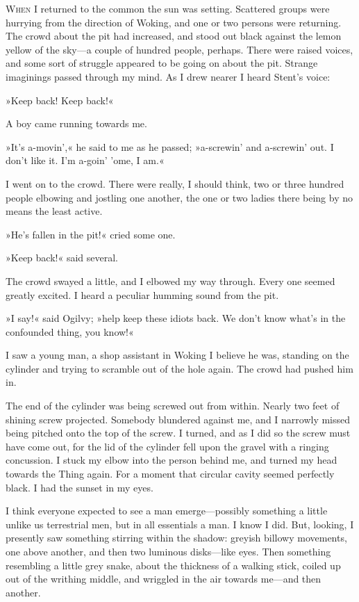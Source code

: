 


\lettrine[lines=4,findent=2pt]{W}{hen} I returned to the common the sun was setting. Scattered groups were hurrying from the direction of Woking, and one or two persons were returning. The crowd about the pit had increased, and stood out black against the lemon yellow of the sky—a couple of hundred people, perhaps. There were raised voices, and some sort of struggle appeared to be going on about the pit. Strange imaginings passed through my mind. As I drew nearer I heard Stent's voice:

»Keep back! Keep back!«

A boy came running towards me.

»It's a-movin',« he said to me as he passed; »a-screwin' and a-screwin' out. I don't like it. I'm a-goin' 'ome, I am.«

I went on to the crowd. There were really, I should think, two or three hundred people elbowing and jostling one another, the one or two ladies there being by no means the least active.

»He's fallen in the pit!« cried some one.

»Keep back!« said several.

The crowd swayed a little, and I elbowed my way through. Every one seemed greatly excited. I heard a peculiar humming sound from the pit.

»I say!« said Ogilvy; »help keep these idiots back. We don't know what's in the confounded thing, you know!«

I saw a young man, a shop assistant in Woking I believe he was, standing on the cylinder and trying to scramble out of the hole again. The crowd had pushed him in.

The end of the cylinder was being screwed out from within. Nearly two feet of shining screw projected. Somebody blundered against me, and I narrowly missed being pitched onto the top of the screw. I turned, and as I did so the screw must have come out, for the lid of the cylinder fell upon the gravel with a ringing concussion. I stuck my elbow into the person behind me, and turned my head towards the Thing again. For a moment that circular cavity seemed perfectly black. I had the sunset in my eyes.

I think everyone expected to see a man emerge—possibly something a little unlike us terrestrial men, but in all essentials a man. I know I did. But, looking, I presently saw something stirring within the shadow: greyish billowy movements, one above another, and then two luminous disks—like eyes. Then something resembling a little grey snake, about the thickness of a walking stick, coiled up out of the writhing middle, and wriggled in the air towards me—and then another.

